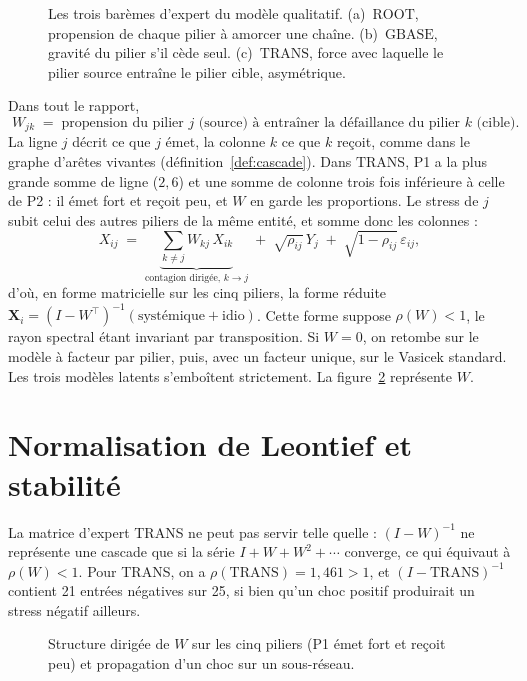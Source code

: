 \begin{figure}[H]\centering
{}
\caption{Les trois barèmes d'expert du modèle qualitatif. (a)~$\mathrm{ROOT}$, propension de
chaque pilier à amorcer une chaîne. (b)~$\mathrm{GBASE}$, gravité du pilier s'il cède seul.
(c)~$\mathrm{TRANS}$, force avec laquelle le pilier source entraîne le pilier cible, asymétrique.}
\label{fig:baremes}
\end{figure}

Dans tout le rapport,
\[
  \boxed{\;W_{jk}\;=\;\text{propension du pilier } j \text{ (source) à entraîner la
  défaillance du pilier } k \text{ (cible).}\;}
\]
La ligne $j$ décrit ce que $j$ émet, la colonne $k$ ce que $k$ reçoit, comme dans le graphe
d'arêtes vivantes (définition~\ref{def:cascade}). Dans $\mathrm{TRANS}$, P1 a la plus grande somme
de ligne ($2{,}6$) et une somme de colonne trois fois inférieure à celle de P2 : il émet fort et
reçoit peu, et $W$ en garde les proportions. Le stress de $j$ subit celui des autres piliers de la même entité, et somme donc les colonnes :
\begin{equation}
X_{ij} \;=\; \underbrace{\sum_{k\neq j} W_{kj}\,X_{ik}}_{\text{contagion dirigée, } k \to j}
   \;+\; \sqrt{\rho_{ij}}\,Y_j \;+\; \sqrt{1-\rho_{ij}}\,\varepsilon_{ij},
\end{equation}
d'où, en forme matricielle sur les cinq piliers, la forme réduite
$\mathbf X_i=(I-W^{\top})^{-1}(\text{systémique}+\text{idio})$. Cette forme suppose
$\rho(W)<1$, le rayon spectral étant invariant par transposition. Si
$W=0$, on retombe sur le modèle à facteur par pilier, puis, avec un facteur unique, sur le Vasicek
standard. Les trois modèles latents s'emboîtent strictement. La figure~\ref{fig:reseau-W} représente $W$.


\section{Normalisation de Leontief et stabilité}

La matrice d'expert TRANS ne peut pas servir telle quelle : $(I-W)^{-1}$ ne représente
une cascade que si la série $I+W+W^2+\cdots$ converge, ce qui équivaut à $\rho(W)<1$. Pour TRANS,
on a $\rho(\mathrm{TRANS})=1{,}461>1$, et $(I-\mathrm{TRANS})^{-1}$ contient 21 entrées négatives
sur 25, si bien qu'un choc positif produirait un stress négatif ailleurs.

\begin{figure}[H]\centering
{}
\caption{Structure dirigée de $W$ sur les cinq piliers (P1 émet fort et reçoit peu) et
propagation d'un choc sur un sous-réseau.}
\label{fig:reseau-W}
\end{figure}

